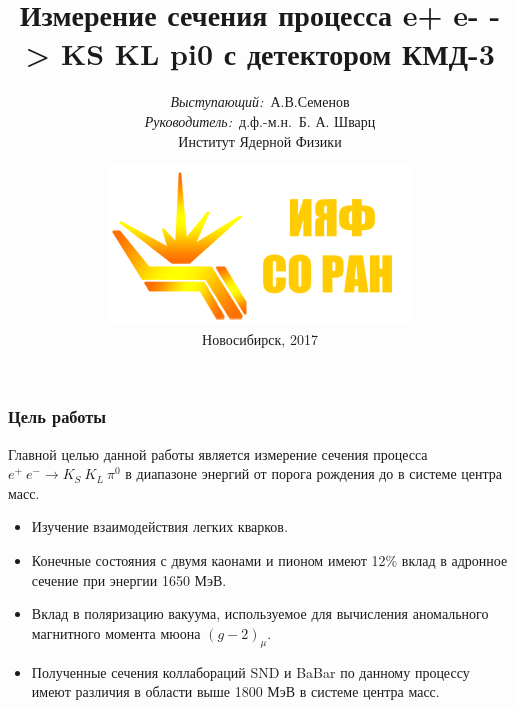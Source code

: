 \documentclass[14pt, hyperref = {colorlinks}]{beamer}
\title{\small{Измерение сечения процесса e+ e- -> KS KL pi0 с детектором КМД-3}}
\author{\small{%
\emph{Выступающий:}~А.В.Семенов\\%
\emph{Руководитель:}~д.ф.-м.н.~Б. А. Шварц}\\%
\vspace{30pt}%
Институт Ядерной Физики
\vspace{0pt}%
}
\date{\includegraphics[width=0.2\linewidth]{logo} \\
\vspace{20pt}%
\small{Новосибирск, 2017}}
\begin{document}
\maketitle

\small
\begin{frame}
\frametitle{Цель работы}\label{t1}
\begin{center}
 Главной целью данной работы является измерение сечения процесса {$e^+\:e^- \to K_{S}\:K_{L}\:\pi^0$} в диапазоне энергий от порога рождения  до  в системе центра масс.
\begin{itemize}
  \item Изучение взаимодействия легких кварков.
  \item Конечные состояния с двумя каонами и пионом имеют 12\% вклад в адронное сечение при энергии 1650 МэВ.
  \item Вклад в поляризацию вакуума, используемое для вычисления аномального магнитного момента мюона {$(g-2)_\mu$}.
  \item Полученные сечения коллабораций SND и BaBar по данному процессу имеют различия в области выше 1800 МэВ в системе центра масс.
\end{itemize}
\end{center}
\end{frame}

\end{document}
